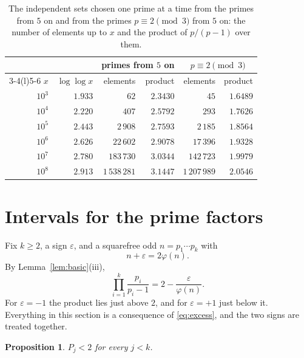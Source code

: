 \documentclass[screen,reqno]{aomart}
\numberwithin{equation}{section}
\theoremstyle{plain}
\newtheorem{proposition}[theorem]{Proposition}
\theoremstyle{definition}
\theoremstyle{remark}
\begin{document}
\begin{table}[ht]
\centering
\caption{The independent sets chosen one prime at a time from the
primes from $5$ on and from the primes $p\equiv2\pmod3$ from $5$ on:
the number of elements up to $x$ and the product of $p/(p-1)$ over
them.}
\label{tab:greedy}
\smallskip
\small
\begin{tabular}{@{}rrrrrr@{}}
\toprule
 & & \multicolumn{2}{c}{primes from $5$ on} &
 \multicolumn{2}{c}{$p\equiv2\pmod3$} \\
\cmidrule(lr){3-4}\cmidrule(l){5-6}
$x$ & $\log\log x$ & elements & product & elements & product \\
\midrule
$10^3$ & $1.933$ & $62$ & $2.3430$ & $45$ & $1.6489$ \\
$10^4$ & $2.220$ & $407$ & $2.5792$ & $293$ & $1.7626$ \\
$10^5$ & $2.443$ & $2\,908$ & $2.7593$ & $2\,185$ & $1.8564$ \\
$10^6$ & $2.626$ & $22\,602$ & $2.9078$ & $17\,396$ & $1.9328$ \\
$10^7$ & $2.780$ & $183\,730$ & $3.0344$ & $142\,723$ & $1.9979$ \\
$10^8$ & $2.913$ & $1\,538\,281$ & $3.1447$ & $1\,207\,989$ & $2.0546$ \\
\bottomrule
\end{tabular}
\end{table}

\section{Intervals for the prime factors}\label{sec:search}

Fix $k\ge2$, a sign $\varepsilon$, and a squarefree odd
$n=p_1\cdots p_k$ with
\begin{equation}\label{eq:M2}
  n+\varepsilon=2\varphi(n).
\end{equation}
By Lemma~\ref{lem:basic}(iii),
\begin{equation}\label{eq:excess}
  \prod_{i=1}^{k}\frac{p_i}{p_i-1}=2-\frac{\varepsilon}{\varphi(n)} .
\end{equation}
For $\varepsilon=-1$ the product lies just above $2$, and for
$\varepsilon=+1$ just below it. Everything in this section is a
consequence of \eqref{eq:excess}, and the two signs are treated
together.

\begin{proposition}\label{prop:below2}
$P_j<2$ for every $j<k$.
\end{proposition}
\end{document}
